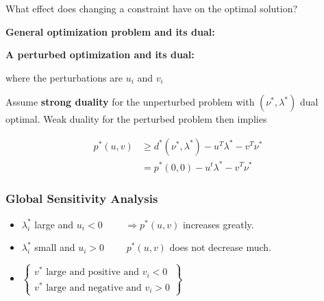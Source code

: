 \documentclass[8pt,a4paper]{scrartcl}
\begin{document}
\begin{multicols*}{3}
What effect does changing a constraint have on the optimal solution?

\finn

\textbf{General optimization problem and its dual:}


\finn

\textbf{A perturbed optimization and its dual:}


where the perturbations are $u_i$ and $v_i$

\finn

Assume \textbf{strong duality} for the unperturbed problem with $(\nu^\ast,\lambda^\ast)$ dual optimal. Weak duality for the perturbed problem then implies

\begin{align*}
p^\ast(u,v)&\geq d^\ast(\nu^\ast,\lambda^\ast)-u^T\lambda^\ast-v^T\nu^\ast\\
&=p^\ast(0,0)-u^t\lambda^\ast-v^T\nu^\ast
\end{align*}

\subsubsection{Global Sensitivity Analysis}

\begin{itemize}
\item $\lambda_i^\ast$ large and $u_i<0$ $\qquad\Rightarrow p^\ast(u,v)$ increases greatly.
\item $\lambda_i^\ast$ small and $u_i>0$ $\qquad p^\ast(u,v)$ does not decrease much.
\item $\left\{\begin{matrix}
v^\ast\text{ large and positive and }v_i<0\\
v^\ast\text{ large and negative and }v_i>0
\end{matrix}\right\}$


\end{itemize}
\end{multicols*}
\end{document}
